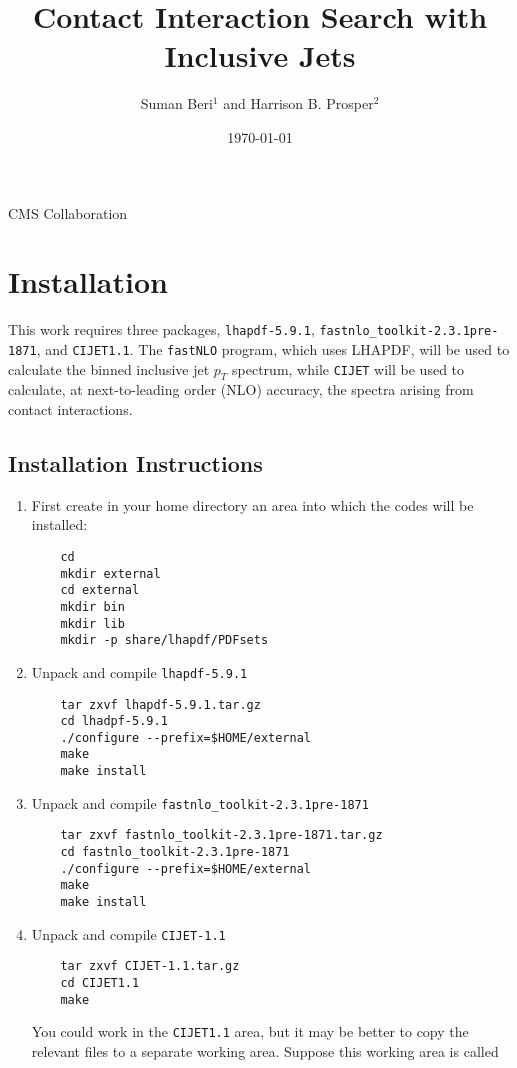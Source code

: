 \documentclass[aps,prd,preprint,nofootinbib]{revtex4}
\begin{document}
\title{Contact Interaction Search with Inclusive Jets}

\author{Suman Beri$^1$ and Harrison B. Prosper$^2$}



\centerline{\large{CMS Collaboration}}

\date{\today}

\maketitle


\section{Installation}
This work requires three packages, {\tt lhapdf-5.9.1}, {\tt fastnlo\_toolkit-2.3.1pre-1871}, and
{\tt CIJET1.1}. The {\tt fastNLO} program, which uses {LHAPDF}, will be used to calculate the binned inclusive jet 
$p_T$ spectrum, while {\tt CIJET} will be used to calculate, at next-to-leading order (NLO) accuracy,  the spectra arising from contact
interactions.

\subsection{Installation Instructions}
\begin{enumerate}
\item
First create in your home directory an area into which the codes will be installed:
	\begin{verbatim}
	cd
	mkdir external
	cd external
	mkdir bin
	mkdir lib
	mkdir -p share/lhapdf/PDFsets
	\end{verbatim}

\item Unpack and compile {\tt lhapdf-5.9.1}
	\begin{verbatim}
	tar zxvf lhapdf-5.9.1.tar.gz
	cd lhadpf-5.9.1
	./configure --prefix=$HOME/external
	make
	make install
	\end{verbatim}


\item Unpack and compile {\tt fastnlo\_toolkit-2.3.1pre-1871}
	\begin{verbatim}
	tar zxvf fastnlo_toolkit-2.3.1pre-1871.tar.gz
	cd fastnlo_toolkit-2.3.1pre-1871
	./configure --prefix=$HOME/external
	make
	make install
	\end{verbatim}

\item Unpack and compile {\tt CIJET-1.1}
	\begin{verbatim}
	tar zxvf CIJET-1.1.tar.gz
	cd CIJET1.1
	make
	\end{verbatim}
	
	You could work in the {\tt CIJET1.1} area, but it may be better to copy the relevant files to a separate working area. Suppose this working area is called
\end{enumerate}
\end{document}
